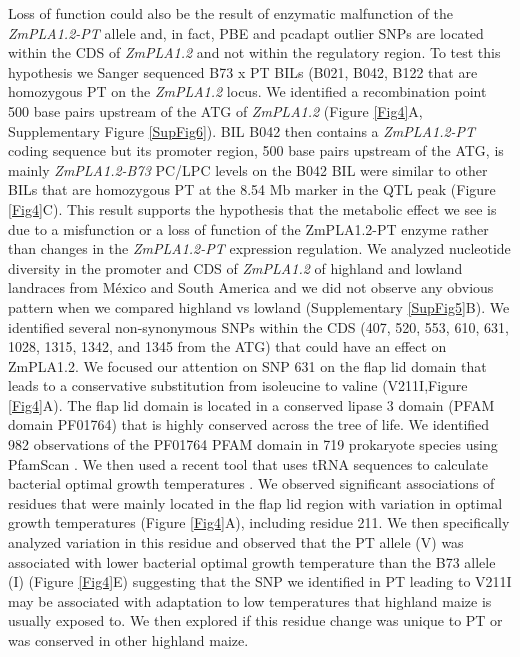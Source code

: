 \documentclass[9pt,twocolumn,twoside,lineno]{BioRxiv}
\begin{document}
Loss of function could also be the result of enzymatic malfunction of the \textit{ZmPLA1.2-PT} allele and, in fact, PBE and pcadapt outlier SNPs are located within the CDS of \textit{ZmPLA1.2} and not within the regulatory region. To test this hypothesis we Sanger sequenced B73 x PT BILs (B021, B042, B122 that are homozygous PT on the \textit{ZmPLA1.2} locus.
We identified a recombination point 500 base pairs upstream of the ATG of \textit{ZmPLA1.2} (Figure \ref{Fig4}A, Supplementary Figure \ref{SupFig6}).
BIL B042 then contains a \textit{ZmPLA1.2-PT} coding sequence but its promoter region, 500 base pairs upstream of the ATG, is mainly \textit{ZmPLA1.2-B73}  
PC/LPC levels on the B042 BIL were similar to other BILs that are homozygous PT at the 8.54 Mb marker in the QTL peak (Figure \ref{Fig4}C). 
This result supports the hypothesis that the metabolic effect we see is due to a misfunction or a loss of function of the ZmPLA1.2-PT enzyme rather than changes in the \textit{ZmPLA1.2-PT} expression regulation. 
We analyzed nucleotide diversity in the promoter and CDS of \textit{ZmPLA1.2} of highland and lowland landraces from México and South America and we did not observe any obvious pattern  when we compared highland vs lowland (Supplementary \ref{SupFig5}B).
We identified several non-synonymous SNPs within the CDS (407, 520, 553, 610, 631, 1028, 1315, 1342, and 1345 from the ATG) that could have an effect on ZmPLA1.2.
We focused our attention on SNP 631 on the flap lid domain that leads to a conservative substitution from isoleucine to valine (V211I,Figure \ref{Fig4}A).  
The flap lid domain is located in a conserved lipase 3 domain (PFAM domain PF01764) that is highly conserved across the tree of life. 
We identified 982 observations of the PF01764 PFAM domain in 719 prokaryote species using PfamScan \cite{Potter2018-tk, El-Gebali2019-pw}.
We then used a recent tool that uses tRNA sequences to calculate bacterial optimal growth temperatures \cite{Cimen2020-dm}.
We observed significant associations of residues that were mainly located in the flap lid region with variation in optimal growth temperatures (Figure \ref{Fig4}A), including residue 211. 
We then specifically analyzed variation in this residue and observed that the PT allele (V) was associated with lower bacterial optimal growth temperature than the B73 allele (I) (Figure \ref{Fig4}E) suggesting that the SNP we identified in PT leading to V211I may be associated with adaptation to low temperatures that highland maize is usually exposed to. 
We then explored if this residue change was unique to PT or was conserved in other highland maize.
\end{document}
